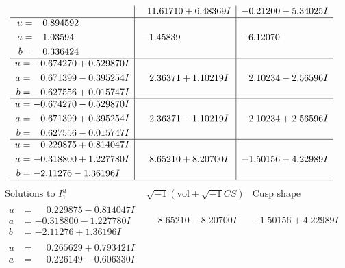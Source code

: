 \documentclass[1p]{elsarticle_modified}
\theoremstyle{definition}
\newcommand{\I}{\sqrt{-1}}
\begin{document}
$$\begin{array}{c|c|c}
 & \phantom{-}11.61710 + 6.48369 I & -0.21200 - 5.34025 I \\ \hline\begin{aligned}
u &= \phantom{-}0.894592\phantom{ +0.000000I} \\
a &= \phantom{-}1.03594\phantom{ +0.000000I} \\
b &= \phantom{-}0.336424\phantom{ +0.000000I}\end{aligned}
 & -1.45839\phantom{ +0.000000I} & -6.12070\phantom{ +0.000000I} \\ \hline\begin{aligned}
u &= -0.674270 + 0.529870 I \\
a &= \phantom{-}0.671399 - 0.395254 I \\
b &= \phantom{-}0.627556 + 0.015747 I\end{aligned}
 & \phantom{-}2.36371 + 1.10219 I & \phantom{-}2.10234 - 2.56596 I \\ \hline\begin{aligned}
u &= -0.674270 - 0.529870 I \\
a &= \phantom{-}0.671399 + 0.395254 I \\
b &= \phantom{-}0.627556 - 0.015747 I\end{aligned}
 & \phantom{-}2.36371 - 1.10219 I & \phantom{-}2.10234 + 2.56596 I \\ \hline\begin{aligned}
u &= \phantom{-}0.229875 + 0.814047 I \\
a &= -0.318800 + 1.227780 I \\
b &= -2.11276 - 1.36196 I\end{aligned}
 & \phantom{-}8.65210 + 8.20700 I & -1.50156 - 4.22989 I\\
 \hline 
 \end{array}$$\newpage$$\begin{array}{c|c|c}  
\text{Solutions to }I^u_{1}& \I (\text{vol} + \sqrt{-1}CS) & \text{Cusp shape}\\
 \hline 
\begin{aligned}
u &= \phantom{-}0.229875 - 0.814047 I \\
a &= -0.318800 - 1.227780 I \\
b &= -2.11276 + 1.36196 I\end{aligned}
 & \phantom{-}8.65210 - 8.20700 I & -1.50156 + 4.22989 I \\ \hline\begin{aligned}
u &= \phantom{-}0.265629 + 0.793421 I \\
a &= \phantom{-}0.226149 - 0.606330 I \\

\end{aligned}
\end{array}$$
\end{document}
